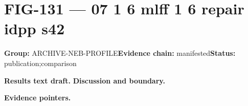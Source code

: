 \clearpage
\section{FIG-131 --- 07 1 6 mlff 1 6 repair idpp s42}
\label{figpage:fig-131}
\textbf{Group:} ARCHIVE-NEB-PROFILE\quad \textbf{Evidence chain:} manifested\quad \textbf{Status:} publication;comparison

\textbf{Results text draft.} 
\textbf{Discussion and boundary.} 


\textbf{Evidence pointers.}



\vfill
